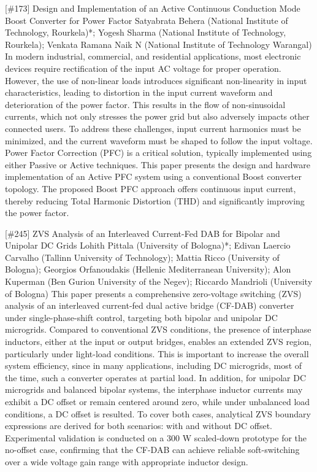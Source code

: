 {} \begin{abstract_online} {[\#173] Design and Implementation of an Active Continuous Conduction Mode Boost Converter for Power Factor } {} {Satyabrata Behera (National Institute of Technology, Rourkela)*; Yogesh  Sharma  (National Institute of Technology, Rourkela); Venkata Ramana  Naik N (National Institute of Technology Warangal)} {} In modern industrial, commercial, and residential applications, most electronic devices require rectification of the input AC voltage for proper operation. However, the use of non-linear loads introduces significant non-linearity in input characteristics, leading to distortion in the input current waveform and deterioration of the power factor. This results in the flow of non-sinusoidal currents, which not only stresses the power grid but also adversely impacts other connected users. To address these challenges, input current harmonics must be minimized, and the current waveform must be shaped to follow the input voltage. Power Factor Correction (PFC) is a critical solution, typically implemented using either Passive or Active techniques. This paper presents the design and hardware implementation of an Active PFC system using a conventional Boost converter topology. The proposed Boost PFC approach offers continuous input current, thereby reducing Total Harmonic Distortion (THD) and significantly improving the power factor. \end{abstract_online} 
{} \begin{abstract_online} {[\#245] ZVS Analysis of an Interleaved Current-Fed DAB for Bipolar and Unipolar DC Grids} {} {Lohith Pittala (University of Bologna)*; Edivan Laercio Carvalho (Tallinn University of Technology); Mattia Ricco (University of Bologna); Georgios Orfanoudakis (Hellenic Mediterranean University); Alon  Kuperman (Ben Gurion University of the Negev); Riccardo Mandrioli (University of Bologna)} {} This paper presents a comprehensive zero-voltage switching (ZVS) analysis of an interleaved current-fed dual active bridge (CF-DAB) converter under single-phase-shift control, targeting both bipolar and unipolar DC microgrids. Compared to conventional ZVS conditions, the presence of interphase inductors, either at the input or output bridges, enables an extended ZVS region, particularly under light-load conditions. This is important to increase the overall system efficiency, since in many applications, including DC microgrids, most of the time, such a converter operates at partial load. In addition, for unipolar DC microgrids and balanced bipolar systems, the interphase inductor currents may exhibit a DC offset or remain centered around zero, while under unbalanced load conditions, a DC offset is resulted. To cover both cases, analytical ZVS boundary expressions are derived for both scenarios: with and without DC offset. Experimental validation is conducted on a 300 W scaled-down prototype for the no-offset case, confirming that the CF-DAB can achieve reliable soft-switching over a wide voltage gain range with appropriate inductor design. \end{abstract_online} 
